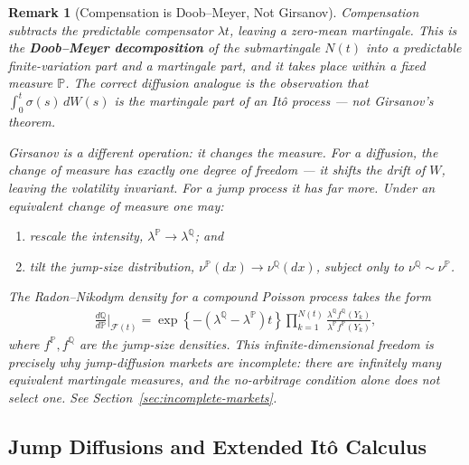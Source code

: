 \documentclass{report}
\theoremstyle{spacedplain}
\theoremstyle{spaceddefinition}
\theoremstyle{spacedremark}
\newtheorem{remark}[theorem]{Remark}
\begin{document}
\begin{remark}[Compensation is Doob--Meyer, Not Girsanov]
Compensation subtracts the predictable compensator $\lambda t$, leaving a zero-mean martingale. This is the \textbf{Doob--Meyer decomposition} of the submartingale $N(t)$ into a predictable finite-variation part and a martingale part, and it takes place \emph{within a fixed measure} $\mathbb{P}$. The correct diffusion analogue is the observation that $\int_0^t \sigma(s)\,dW(s)$ is the martingale part of an It\^o process --- not Girsanov's theorem.

Girsanov is a different operation: it \emph{changes the measure}. For a diffusion, the change of measure has exactly one degree of freedom --- it shifts the drift of $W$, leaving the volatility invariant. For a jump process it has far more. Under an equivalent change of measure one may:
\begin{enumerate}[noitemsep]
    \item rescale the intensity, $\lambda^{\mathbb{P}} \to \lambda^{\mathbb{Q}}$; and
    \item tilt the jump-size distribution, $\nu^{\mathbb{P}}(dx) \to \nu^{\mathbb{Q}}(dx)$, subject only to $\nu^{\mathbb{Q}} \sim \nu^{\mathbb{P}}$.
\end{enumerate}
The Radon--Nikodym density for a compound Poisson process takes the form
\begin{align}
    \frac{d\mathbb{Q}}{d\mathbb{P}}\bigg|_{\mathcal{F}(t)} = \exp\left\{-(\lambda^{\mathbb{Q}} - \lambda^{\mathbb{P}})t\right\}\prod_{k=1}^{N(t)} \frac{\lambda^{\mathbb{Q}} f^{\mathbb{Q}}(Y_k)}{\lambda^{\mathbb{P}} f^{\mathbb{P}}(Y_k)},
\end{align}
where $f^{\mathbb{P}}, f^{\mathbb{Q}}$ are the jump-size densities. This infinite-dimensional freedom is precisely why jump-diffusion markets are \emph{incomplete}: there are infinitely many equivalent martingale measures, and the no-arbitrage condition alone does not select one. See Section~\ref{sec:incomplete-markets}.
\end{remark}

\subsection{Jump Diffusions and Extended It\^o Calculus}
\end{document}
